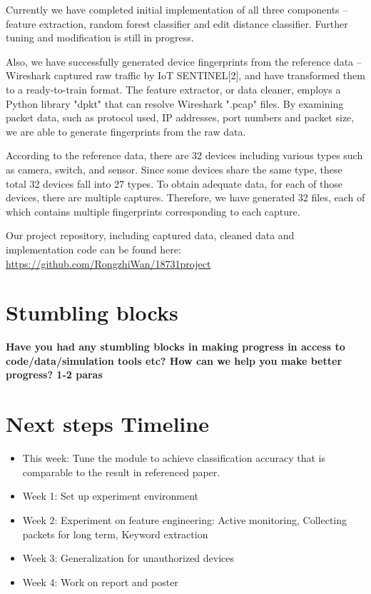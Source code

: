 \documentclass[twocolumn,10pt]{article}
\begin{document}
Currently we have completed initial implementation of all three components -- feature extraction, random forest classifier and edit distance classifier. Further tuning and modification is still in progress. 

Also, we have successfully generated device fingerprints from the reference data -- Wireshark captured raw traffic by IoT SENTINEL[2], and have transformed them to a ready-to-train format. The feature extractor, or data cleaner, employs a Python library "dpkt" that can resolve Wireshark ".pcap" files. By examining packet data, such as protocol used, IP addresses, port numbers and packet size, we are able to generate fingerprints from the raw data.

According to the reference data, there are 32 devices including various types such as camera, switch, and sensor. Since some devices share the same type, these total 32 devices fall into 27 types. To obtain adequate data, for each of those devices, there are multiple captures. Therefore, we have generated 32 files, each of which contains multiple fingerprints corresponding to each capture.

Our project repository, including captured data, cleaned data and implementation code can be found here:  
\url{https://github.com/RongzhiWan/18731project}

\section{Stumbling blocks}

{\bf Have you had any stumbling blocks in making progress in access to code/data/simulation tools etc? How can we help you make better progress? 1-2 paras}


\section{Next steps  Timeline}

\begin{itemize}
   \item This week: Tune the module to achieve classification accuracy that is comparable to the result in referenced paper.
   \item Week 1: Set up experiment environment 
   \item Week 2: Experiment on feature engineering: Active monitoring, Collecting packets for long term, Keyword extraction
   \item Week 3: Generalization for unauthorized devices
   \item Week 4: Work on report and poster
\end{itemize}
\end{document}
